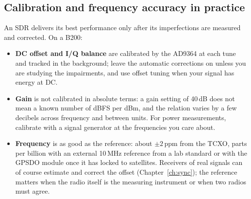 \subsection{Calibration and frequency accuracy in practice}

An SDR delivers its best performance only after its imperfections are measured and corrected. On a B200:
\begin{itemize}
\item \textbf{DC offset and I/Q balance} are calibrated by the AD9364 at each tune and tracked in the
background; leave the automatic corrections on unless you are studying the impairments, and use offset
tuning when your signal has energy at DC.
\item \textbf{Gain} is not calibrated in absolute terms: a gain setting of 40\,dB does not mean a known
number of dBFS per dBm, and the relation varies by a few decibels across frequency and between units. For
power measurements, calibrate with a signal generator at the frequencies you care about.
\item \textbf{Frequency} is as good as the reference: about $\pm2$\,ppm from the TCXO, parts per billion
with an external 10\,MHz reference from a lab standard or with the GPSDO module once it has locked to
satellites. Receivers of real signals can of course estimate and correct the offset (Chapter~\ref{ch:sync});
the reference matters when the radio itself is the measuring instrument or when two radios must agree.
\end{itemize}


